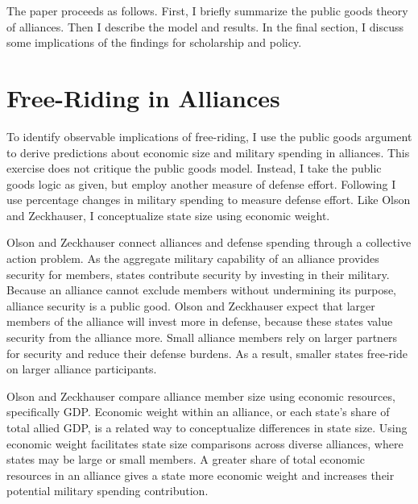 \documentclass[12pt]{article}
\begin{document}
The paper proceeds as follows.
First, I briefly summarize the public goods theory of alliances.
Then I describe the model and results. 
In the final section, I discuss some implications of the findings for scholarship and policy. 



\section{Free-Riding in Alliances}

To identify observable implications of free-riding, I use the public goods argument to derive predictions about economic size and military spending in alliances.
This exercise does not critique the public goods model.
Instead, I take the public goods logic as given, but employ another measure of defense effort. 
Following \citet{PluemperNeumayer2015} I use percentage changes in military spending to measure defense effort.
Like Olson and Zeckhauser, I conceptualize state size using economic weight. 


Olson and Zeckhauser connect alliances and defense spending through a collective action problem. 
As the aggregate military capability of an alliance provides security for members, states contribute security by investing in their military.
Because an alliance cannot exclude members without undermining its purpose, alliance security is a public good. 
Olson and Zeckhauser expect that larger members of the alliance will invest more in defense, because these states value security from the alliance more.
Small alliance members rely on larger partners for security and reduce their defense burdens.
As a result, smaller states free-ride on larger alliance participants. 


Olson and Zeckhauser compare alliance member size using economic resources, specifically GDP.
Economic weight within an alliance, or each state's share of total allied GDP, is a related way to conceptualize differences in state size.
Using economic weight facilitates state size comparisons across diverse alliances, where states may be large or small members. 
A greater share of total economic resources in an alliance gives a state more economic weight and increases their potential military spending contribution. 
\end{document}
